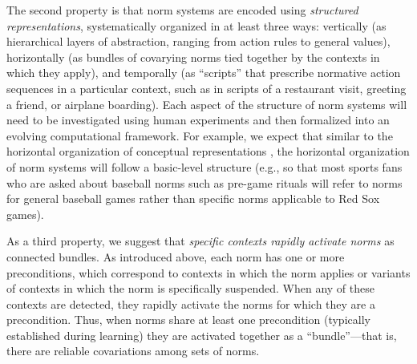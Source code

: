 \documentclass[12pt]{article}
\begin{document}


The second property is that norm systems are encoded using {\em
 structured representations}, systematically organized in at least three ways: 
 vertically (as hierarchical layers of abstraction, ranging
from action rules to general values), horizontally (as bundles of
covarying norms tied together by the contexts in which they apply),
and temporally (as ``scripts'' \citep{schank77} that prescribe
normative action sequences in a particular context, such as in scripts
of a restaurant visit, greeting a friend, or airplane boarding). Each
aspect of the structure of norm systems will need to be investigated
using human experiments and then formalized into an evolving
computational framework. For example, we expect that similar to the
horizontal organization of conceptual representations \citep{rosch76}, the horizontal organization of norm
systems will follow a basic-level structure (e.g., so that most sports
fans who are asked about baseball norms such as pre-game rituals will
refer to norms for general baseball games rather than specific norms
applicable to Red Sox games).

As a third property, we suggest that {\em specific contexts rapidly
activate norms} as connected bundles. As introduced above, each norm
has one or more preconditions, which correspond to contexts in which
the norm applies or variants of contexts in which the norm is
specifically suspended. When any of these contexts are detected, they
rapidly activate the norms for which they are a precondition.  Thus,
when norms share at least one precondition (typically established
during learning) they are activated together as a ``bundle''---that
is, there are reliable covariations among sets of norms.

\end{document}
